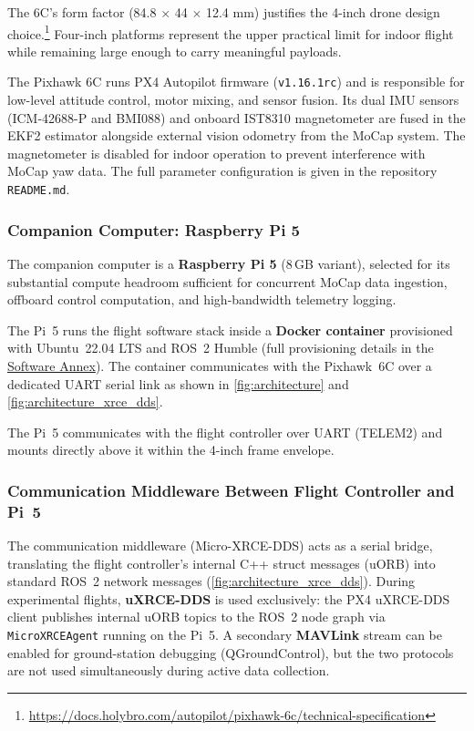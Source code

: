 The 6C's form factor (84.8 \(\times\) 44 \(\times\) 12.4 mm) justifies the 4-inch drone design choice.\footnote{\url{https://docs.holybro.com/autopilot/pixhawk-6c/technical-specification}} Four-inch platforms represent the upper practical limit for indoor flight while remaining large enough to carry meaningful payloads.

The Pixhawk 6C runs PX4 Autopilot firmware (\texttt{v1.16.1rc}) and is responsible for low-level attitude control, motor mixing, and sensor fusion. Its dual IMU sensors (ICM-42688-P and BMI088) and onboard IST8310 magnetometer are fused in the EKF2 estimator alongside external vision odometry from the MoCap system. The magnetometer is disabled for indoor operation to prevent interference with MoCap yaw data. The full parameter configuration is given in the repository \texttt{README.md}.

\subsubsection{Companion Computer: Raspberry Pi 5}

The companion computer is a \textbf{Raspberry Pi 5} (8\,GB variant), selected for its substantial compute headroom sufficient for concurrent MoCap data ingestion, offboard control computation, and high-bandwidth telemetry logging.

The Pi~5 runs the flight software stack inside a \textbf{Docker container} provisioned with Ubuntu~22.04 LTS and ROS~2 Humble (full provisioning details in the \hyperref[sec:appendix_architecture]{Software Annex}). The container communicates with the Pixhawk~6C over a dedicated UART serial link as shown in \autoref{fig:architecture} and \ref{fig:architecture_xrce_dds}.

The Pi~5 communicates with the flight controller over UART (TELEM2) and mounts directly above it within the 4-inch frame envelope.

\subsubsection{Communication Middleware Between Flight Controller and Pi~5}

The communication middleware (Micro-XRCE-DDS) acts as a serial bridge, translating the flight controller's internal C++ struct messages (uORB) into standard ROS~2 network messages (\autoref{fig:architecture_xrce_dds}). During experimental flights, \textbf{uXRCE-DDS} is used exclusively: the PX4 uXRCE-DDS client publishes internal uORB topics to the ROS~2 node graph via \texttt{MicroXRCEAgent} running on the Pi~5. A secondary \textbf{MAVLink} stream can be enabled for ground-station debugging (QGroundControl), but the two protocols are not used simultaneously during active data collection.

